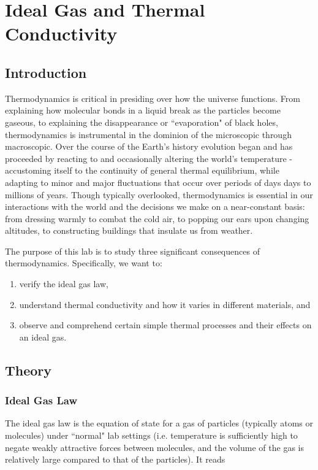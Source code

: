 \chapter{Ideal Gas and Thermal Conductivity}
\label{chap:gas}
\section{Introduction}

Thermodynamics is critical in presiding over how the universe functions.  From explaining how molecular bonds in a liquid break as the particles become gaseous, to explaining the disappearance or ``evaporation" of black holes, thermodynamics is instrumental in the dominion of the microscopic through macroscopic.  Over the course of the Earth's history evolution began and has proceeded by reacting to and occasionally altering the world's temperature - accustoming itself to the continuity of general thermal equilibrium, while adapting to minor and major fluctuations that occur over periods of days days to millions of years.  Though typically overlooked, thermodynamics is essential in our interactions with the world and the decisions we make on a near-constant basis: from dressing warmly to combat the cold air, to popping our ears upon changing altitudes, to constructing buildings that insulate us from weather.\myskip

The purpose of this lab is to study three significant consequences of thermodynamics.  Specifically, we want to:
\begin{enumerate}
\item verify the ideal gas law,
\item understand thermal conductivity and how it varies in different materials, and
\item observe and comprehend certain simple thermal processes and their effects on an ideal gas.
\end{enumerate}

\section{Theory}
\label{thermtheory}
\subsection{Ideal Gas Law}
\label{idealtheory}
The ideal gas law is the equation of state for a gas of particles (typically atoms or molecules) under ``normal" lab settings (i.e. temperature is sufficiently high to negate weakly attractive forces between molecules, and the volume of the gas is relatively large compared to that of the particles).  It reads

